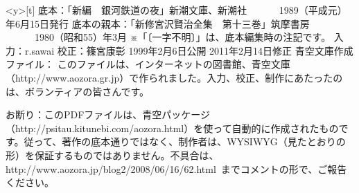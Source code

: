 \theendnotes
\begin{teihon}
\clearpage\thispagestyle{empty}
\begin{minipage}<y>[t]{\textheight}
\vspace{0.5\baselineskip}
\scriptsize
底本：「新編　銀河鉄道の夜」新潮文庫、新潮社
　　　1989（平成元）年6月15日発行
底本の親本：「新修宮沢賢治全集　第十三巻」筑摩書房
　　　1980（昭和55）年3月
※「〔一字不明〕」は、底本編集時の注記です。
入力：r.sawai
校正：篠宮康彰
1999年2月6日公開
2011年2月14日修正
青空文庫作成ファイル：
このファイルは、インターネットの図書館、青空文庫（http://www.aozora.gr.jp）で作られました。入力、校正、制作にあたったのは、ボランティアの皆さんです。

\vspace{0.5\baselineskip}
お断り：このPDFファイルは、青空パッケージ（http://psitau.kitunebi.com/aozora.html）を使って自動的に作成されたものです。従って、著作の底本通りではなく、制作者は、WYSIWYG（見たとおりの形）を保証するものではありません。不具合は、http://www.aozora.jp/blog2/2008/06/16/62.html\ までコメントの形で、ご報告ください。


\end{minipage}
\end{teihon}
